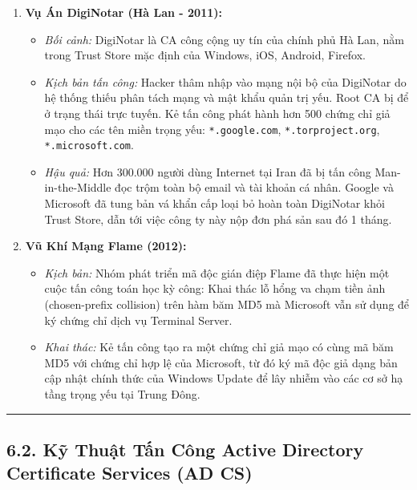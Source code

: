 \documentclass[
]{article}
\providecommand{\tightlist}{%
  \setlength{\itemsep}{0pt}\setlength{\parskip}{0pt}}
\begin{document}
\begin{enumerate}
\def\labelenumi{\arabic{enumi}.}
\tightlist
\item
  \textbf{Vụ Án DigiNotar (Hà Lan - 2011):}

  \begin{itemize}
  \tightlist
  \item
    \emph{Bối cảnh:} DigiNotar là CA công cộng uy tín của chính phủ Hà
    Lan, nằm trong Trust Store mặc định của Windows, iOS, Android,
    Firefox.
  \item
    \emph{Kịch bản tấn công:} Hacker thâm nhập vào mạng nội bộ của
    DigiNotar do hệ thống thiếu phân tách mạng và mật khẩu quản trị yếu.
    Root CA bị để ở trạng thái trực tuyến. Kẻ tấn công phát hành hơn 500
    chứng chỉ giả mạo cho các tên miền trọng yếu: \texttt{*.google.com},
    \texttt{*.torproject.org}, \texttt{*.microsoft.com}.
  \item
    \emph{Hậu quả:} Hơn 300.000 người dùng Internet tại Iran đã bị tấn
    công Man-in-the-Middle đọc trộm toàn bộ email và tài khoản cá nhân.
    Google và Microsoft đã tung bản vá khẩn cấp loại bỏ hoàn toàn
    DigiNotar khỏi Trust Store, dẫn tới việc công ty này nộp đơn phá sản
    sau đó 1 tháng.
  \end{itemize}
\item
  \textbf{Vũ Khí Mạng Flame (2012):}

  \begin{itemize}
  \tightlist
  \item
    \emph{Kịch bản:} Nhóm phát triển mã độc gián điệp Flame đã thực hiện
    một cuộc tấn công toán học kỳ công: Khai thác lỗ hổng va chạm tiền
    ảnh (chosen-prefix collision) trên hàm băm MD5 mà Microsoft vẫn sử
    dụng để ký chứng chỉ dịch vụ Terminal Server.
  \item
    \emph{Khai thác:} Kẻ tấn công tạo ra một chứng chỉ giả mạo có cùng
    mã băm MD5 với chứng chỉ hợp lệ của Microsoft, từ đó ký mã độc giả
    dạng bản cập nhật chính thức của Windows Update để lây nhiễm vào các
    cơ sở hạ tầng trọng yếu tại Trung Đông.
  \end{itemize}
\end{enumerate}

\begin{center}\rule{0.5\linewidth}{0.5pt}\end{center}

\subsection{6.2. Kỹ Thuật Tấn Công Active Directory Certificate Services
(AD
CS)}\label{kux1ef9-thuux1eadt-tux1ea5n-cuxf4ng-active-directory-certificate-services-ad-cs}
\end{document}
